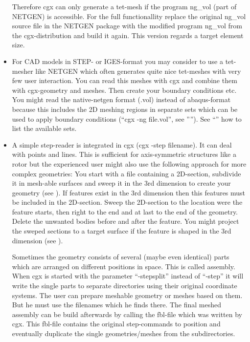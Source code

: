 \documentclass{article}
\begin{document}
\begin{appendix}
\begin{itemize}
Therefore cgx can only generate a tet-mesh if the program ng\_vol (part of NETGEN) is accessible. For the full functionallity replace the original ng\_vol source file in the NETGEN package with the modified program ng\_vol from the cgx-distribution and build it again. This version regards a target element size.

\item For CAD models in STEP- or IGES-format you may consider to use a tet-mesher like NETGEN \cite{NETGEN} which often generates quite nice tet-meshes with very few user interaction. You can read this meshes with cgx and combine them with cgx-geometry and meshes. Then create your boundary conditions etc. You might read the native-netgen format (.vol) instead of abaqus-format because this includes the 2D meshing regions in separate sets which can be used to apply boundary conditions (``cgx -ng file.vol'', see ''''). See ``'' how to list the available sets.

\item A simple step-reader is integrated in cgx (cgx -step filename). It can deal with points and lines. This is sufficient for axis-symmetric structures like a rotor but the experienced user might also use the following approach for more complex geometries: You start with a file containing a 2D-section, subdivide it in mesh-able surfaces and sweep it in the 3rd dimension to create your geometry (see ). If features exist in the 3rd dimension then this features must be included in the 2D-section. Sweep the 2D-section to the location were the feature starts, then right to the end and at last to the end of the geometry. Delete the unwanted bodies before and after the feature. You might project the sweped sections to a target surface if the feature is shaped in the 3rd dimension (see ).

Sometimes the geometry consists of several (maybe even identical) parts which are arranged on different positions in space. This is called assembly. When cgx is started with the parameter ``-stepsplit'' instead of ``-step'' it will write the single parts to separate directories using their original coordinate systems. The user can prepare meshable geometry or meshes based on them. But he must use the filenames which he finds there. The final meshed assembly can be build afterwards by calling the fbl-file which was written by cgx. This fbl-file contains the original step-commands to position and eventually duplicate the single geometries/meshes from the subdirectories.   
\end{itemize}


\end{appendix}
\end{document}
